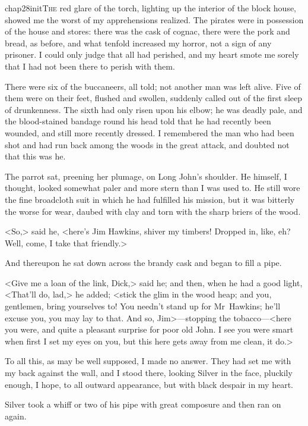 
\lettrine{chap28initT}{he} red glare of the torch, lighting up the interior of the block house, showed me the worst of my apprehensions realized. The pirates were in possession of the house and stores: there was the cask of cognac, there were the pork and bread, as before, and what tenfold increased my horror, not a sign of any prisoner. I could only judge that all had perished, and my heart smote me sorely that I had not been there to perish with them.

There were six of the buccaneers, all told; not another man was left alive. Five of them were on their feet, flushed and swollen, suddenly called out of the first sleep of drunkenness. The sixth had only risen upon his elbow; he was deadly pale, and the blood-stained bandage round his head told that he had recently been wounded, and still more recently dressed. I remembered the man who had been shot and had run back among the woods in the great attack, and doubted not that this was he.

The parrot sat, preening her plumage, on Long John's shoulder. He himself, I thought, looked somewhat paler and more stern than I was used to. He still wore the fine broadcloth suit in which he had fulfilled his mission, but it was bitterly the worse for wear, daubed with clay and torn with the sharp briers of the wood.

<So,> said he, <here's Jim Hawkins, shiver my timbers! Dropped in, like, eh? Well, come, I take that friendly.>

And thereupon he sat down across the brandy cask and began to fill a pipe.

<Give me a loan of the link, Dick,> said he; and then, when he had a good light, <That'll do, lad,> he added; <stick the glim in the wood heap; and you, gentlemen, bring yourselves to! You needn't stand up for Mr~Hawkins; he'll excuse you, you may lay to that. And so, Jim>—stopping the tobacco—<here you were, and quite a pleasant surprise for poor old John. I see you were smart when first I set my eyes on you, but this here gets away from me clean, it do.>

To all this, as may be well supposed, I made no answer. They had set me with my back against the wall, and I stood there, looking Silver in the face, pluckily enough, I hope, to all outward appearance, but with black despair in my heart.

Silver took a whiff or two of his pipe with great composure and then ran on again.

